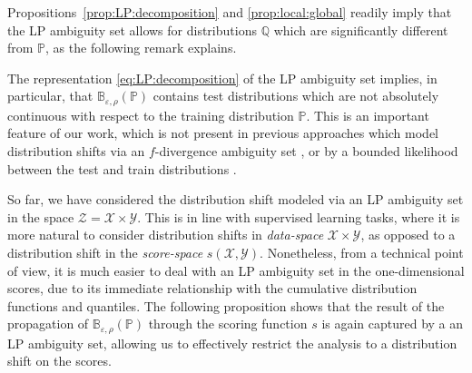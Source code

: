 \documentclass[11pt,a4paper]{article}
\begin{document}
Propositions~\ref{prop:LP:decomposition} and \ref{prop:local:global} readily imply that the LP ambiguity set allows for distributions $\mathbb Q$ which are significantly different from $\mathbb P$, as the following remark explains.


\begin{remark}
\label{remark:absolute:continuity}
The representation \eqref{eq:LP:decomposition} of the LP ambiguity set implies, in particular, that $\mathbb{B}_{\varepsilon,\rho}(\mathbb P)$ contains test distributions which are not absolutely continuous with respect to the training distribution $\mathbb P$. This is an important feature of our work, which is not present in previous approaches which model distribution shifts via an $f$-divergence ambiguity set \cite{cauchois2024robust}, or by a bounded likelihood between the test and train distributions \cite{tibshirani2019conformal}.
\end{remark}

So far, we have considered the distribution shift modeled via an LP ambiguity set in the space $\mathcal Z = \mathcal X \times \mathcal Y$. This is in line with supervised learning tasks, where it is more natural to consider distribution shifts in \emph{data-space} $\mathcal X \times \mathcal Y$, as opposed to a distribution shift in the \emph{score-space} $s(\mathcal X, \mathcal Y)$. Nonetheless, from a technical point of view, it is much easier to deal with an LP ambiguity set in the one-dimensional scores, due to its immediate relationship with the cumulative distribution functions and quantiles. The following proposition shows that the result of the propagation of $\mathbb{B}_{\varepsilon,\rho}(\mathbb P)$ through the scoring function $s$ is again captured by a an LP ambiguity set, allowing us to effectively restrict the analysis to a distribution shift on the scores.
\end{document}
